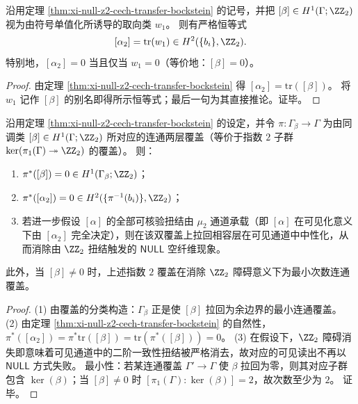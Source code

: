\begin{corollary}\label{cor:xi-null-z2-cech-obstruction-single-source-w1}
沿用定理 \ref{thm:xi-null-z2-cech-transfer-bockstein} 的记号，并把 \([\beta]\in H^1(\Gamma;\ZZ_2)\) 视为由符号单值化所诱导的取向类 \(w_1\)。
则有严格恒等式
\[
[\alpha_2]=\mathrm{tr}(w_1)\in H^2(\{b_i\},\ZZ_2).
\]
特别地，\([\alpha_2]=0\) 当且仅当 \(w_1=0\)（等价地：\([\beta]=0\)）。
\end{corollary}
\begin{proof}
由定理 \ref{thm:xi-null-z2-cech-transfer-bockstein} 得 \([\alpha_2]=\mathrm{tr}([\beta])\)。
将 \(w_1\) 记作 \([\beta]\) 的别名即得所示恒等式；最后一句为其直接推论。证毕。
\end{proof}

\begin{theorem}\label{thm:xi-null-z2-doublecover-min-desingularization}
沿用定理 \ref{thm:xi-null-z2-cech-transfer-bockstein} 的设定，并令
\(\pi:\Gamma_\beta\to\Gamma\)
为由同调类 \([\beta]\in H^1(\Gamma;\ZZ_2)\) 所对应的连通两层覆盖（等价于指数 \(2\) 子群 \(\ker(\pi_1(\Gamma)\twoheadrightarrow\ZZ_2)\) 的覆盖）。
则：
\begin{enumerate}
  \item \(\pi^*([\beta])=0\in H^1(\Gamma_\beta;\ZZ_2)\)；
  \item \(\pi^*([\alpha_2])=0\in H^2(\{\pi^{-1}(b_i)\},\ZZ_2)\)；
  \item 若进一步假设 \([\alpha]\) 的全部可核验扭结由 \(\mu_2\) 通道承载（即 \([\alpha]\) 在可见化意义下由 \([\alpha_2]\) 完全决定），则在该双覆盖上拉回相容层在可见通道中中性化，从而消除由 \(\ZZ_2\) 扭结触发的 \(\mathsf{NULL}\) 空纤维现象。
\end{enumerate}
此外，当 \([\beta]\neq 0\) 时，上述指数 \(2\) 覆盖在消除 \(\ZZ_2\) 障碍意义下为最小次数连通覆盖。
\end{theorem}

\begin{proof}
(1) 由覆盖的分类构造：\(\Gamma_\beta\) 正是使 \([\beta]\) 拉回为余边界的最小连通覆盖。
(2) 由定理 \ref{thm:xi-null-z2-cech-transfer-bockstein} 的自然性，
\(
\pi^*([\alpha_2])=\pi^*\mathrm{tr}([\beta])=\mathrm{tr}(\pi^*([\beta]))=0
\)。
(3) 在假设下，\(\ZZ_2\) 障碍消失即意味着可见通道中的二阶一致性扭结被严格消去，故对应的可见读出不再以 \(\mathsf{NULL}\) 方式失败。
最小性：若某连通覆盖 \(\Gamma'\to\Gamma\) 使 \(\beta\) 拉回为零，则其对应子群包含 \(\ker(\beta)\)；当 \([\beta]\neq 0\) 时 \([\pi_1(\Gamma):\ker(\beta)]=2\)，故次数至少为 \(2\)。
证毕。
\end{proof}

